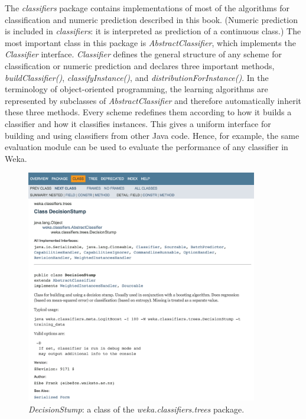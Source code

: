 The \textit{classifiers} package contains implementations of most of
the algorithms for classification and numeric prediction described in
this book. (Numeric prediction is included in \textit{classifiers}: it
is interpreted as prediction of a continuous class.) The most
important class in this package is \textit{AbstractClassifier}, which
implements the \textit{Classifier} interface. \textit{Classifier}
defines the general structure of any scheme for classification or
numeric prediction and declares three important methods,
\textit{buildClassifier()}, \textit{classifyInstance()}, and
\textit{distributionForInstance()}. In the terminology of object-oriented
programming, the learning algorithms are represented by subclasses of
\textit{AbstractClassifier} and therefore automatically inherit these three
methods. Every scheme redefines them according to how it builds a
classifier and how it classifies instances. This gives a uniform
interface for building and using classifiers from other Java
code. Hence, for example, the same evaluation module can be used to
evaluate the performance of any classifier in Weka.

\begin{figure}[!thp]
\centering
\includegraphics[width=0.9\textwidth]{images/B5_2a.png}
\caption{\textit{DecisionStump}: a class of the \textit{weka.classifiers.trees} package.}
\end{figure}

